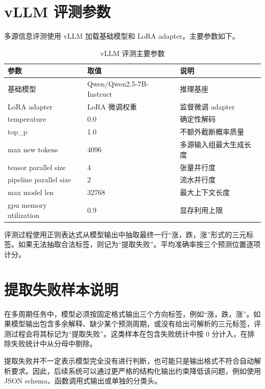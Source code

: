 \section{vLLM 评测参数}

多源信息评测使用 vLLM 加载基础模型和 LoRA adapter。主要参数如下。

\begin{table}[htbp]
  \centering
  \caption{vLLM 评测主要参数}
  \begin{tabular}{lll}
    \toprule
    参数 & 取值 & 说明 \\
    \midrule
    基础模型 & Qwen/Qwen2.5-7B-Instruct & 推理基座 \\
    LoRA adapter & LoRA 微调权重 & 监督微调 adapter \\
    temperature & 0.0 & 确定性解码 \\
    top\_p & 1.0 & 不额外截断概率质量 \\
    max new tokens & 4096 & 多源输入组最大生成长度 \\
    tensor parallel size & 4 & 张量并行度 \\
    pipeline parallel size & 2 & 流水并行度 \\
    max model len & 32768 & 最大上下文长度 \\
    gpu memory utilization & 0.9 & 显存利用上限 \\
    \bottomrule
  \end{tabular}
\end{table}

评测过程使用正则表达式从模型输出中抽取最终一行“涨，跌，涨”形式的三元标签。如果无法抽取合法标签，则记为“提取失败”。平均准确率按三个预测位置逐项计分。


\section{提取失败样本说明}

在多周期任务中，模型必须按固定格式输出三个方向标签，例如“涨，跌，涨”。如果模型输出包含多余解释、缺少某个预测周期，或没有给出可解析的三元标签，评测过程会将其标记为“提取失败”。这类样本在包含失败统计中按 0 分计入，在排除失败统计中从分母中剔除。

提取失败并不一定表示模型完全没有进行判断，也可能只是输出格式不符合自动解析要求。因此，后续系统可以通过更严格的结构化输出约束降低该问题，例如使用 JSON schema、函数调用式输出或单独的分类头。

